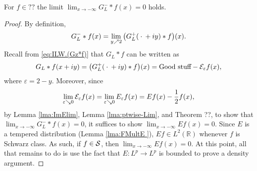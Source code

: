 \documentclass[../dissertation.tex]{subfiles}
\begin{document}
\begin{lma}
	For $f \in ??$ the limit $\lim_{x\to-\infty} G_L^-*f(x) = 0$ holds.
\end{lma}
\begin{proof}
	By definition,
	\[
		G_L^-* f(x) = \lim_{y\nearrow 2} \big(G_L^+(\kern 0.5ex \cdot \kern 0.5ex+iy)*f\big)(x).
	\]
	Recall from \eqref{eq:ILW.(Gz*f)} that $G_L*f$ can be written as 
	\[
		G_L*f(x + iy) 
			= \big(G_L^+(\kern 0.5ex \cdot \kern 0.5ex+iy)*f\big)(x) 
			= \text{Good stuff} - \mathcal E_\varepsilon f(x),
	\]
	where $\varepsilon = 2 - y$. Moreover, since
	\[
		\lim_{\varepsilon \searrow 0} \mathcal E_{\varepsilon}f(x)
			= \lim_{\varepsilon\searrow0} E_{\varepsilon}f(x)
			= Ef(x)-\frac{1}{2}f(x),
	\]
	by Lemma \ref{lma:ImElim}, Lemma \ref{lma:ptwise-Lim}, and Theorem ??, 
	to show that $\lim_{x\to-\infty} G_L^-*f(x)=0$, it suffices to show
	$\lim_{x\to-\infty} Ef(x) = 0$. Since $E$ is a tempered distribution
	(Lemma \ref{lma:FMultE }), $Ef \in L^2(\mathbb R)$ whenever $f$ is 
	Schwarz class. As such, if $f\in \mathcal S$, then $\lim_{x\to-\infty}Ef(x)=0$.
	At this point, all that remains to do is use the fact that $E:L^p \to L^p$
	is bounded to prove a density argument. 
\end{proof}
\end{document}
